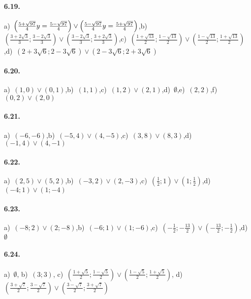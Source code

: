 \paragraph{6.19.} a)~$\left(\frac{5+\sqrt{97}} 4\\y=\frac{5-\sqrt{97}} 4\right)\vee \left(\frac{5-\sqrt{97}} 4\\y=\frac{5+\sqrt{97}} 4\right)$,\quad b)~$\left(\frac{3+{2\sqrt 3}} 3;\frac {3-{2\sqrt 3}} 3\right)\vee \left(\frac {3-{2\sqrt 3}} 3;\frac{3+{2\sqrt 3}} 3\right)$,\quad c)~$\left(\frac{1+\sqrt{13}} 2;\frac{1-\sqrt{13}} 2\right)\vee \left(\frac{1-\sqrt{13}} 2;\frac{1+\sqrt{13}} 2\right)$,\quad d)~$\left(2+3\sqrt 6;2-3\sqrt 6\right)\vee \left(2-3\sqrt 6;2+3\sqrt 6\right)$

\paragraph{6.20.} a)~$(1,0)\vee(0,1)$,\quad b)~$(1,1)$,\quad c)~$(1,2)\vee(2,1)$,\quad d)~$\emptyset$,\quad e)~$(2,2)$,\quad f)~$(0,2)\vee(2,0)$

\paragraph{6.21.} a)~$(-6,-6)$,\quad b)~$(-5,4)\vee(4,-5)$,\quad c)~$(3,8)\vee(8,3)$,\quad d)~$(-1,4)\vee(4,-1)$

\paragraph{6.22.} a)~$(2,5)\vee(5,2)$,\quad b)~$(-3,2)\vee(2,-3)$,\quad c)~$(\frac 1 2;1)\vee(1;\frac 1 2)$,\quad d)~$(-4;1)\vee(1;-4)$

\paragraph{6.23.} a)~$(-8;2)\vee(2;-8)$,\quad b)~$(-6;1)\vee(1;-6)$,\quad c)~$\left(-\frac 1 2;-\frac{13} 2\right)\vee \left(-\frac{13} 2;-\frac 1 2\right)$,\quad d)~$\emptyset $

\paragraph{6.24.} a)~$\emptyset $,\; b)~$(3;3)$,\; c)~$\left(\frac{1+\sqrt 5} 2;\frac{1-\sqrt 5} 2\right)\vee \left(\frac{1-\sqrt 5} 2;\frac{1+\sqrt 5} 2\right)$,\; d)~$\left(\frac{3+\sqrt 7} 2;\frac{3-\sqrt 7} 2\right)\vee \left(\frac{3-\sqrt 7} 2;\frac{3+\sqrt 7} 2\right)$

